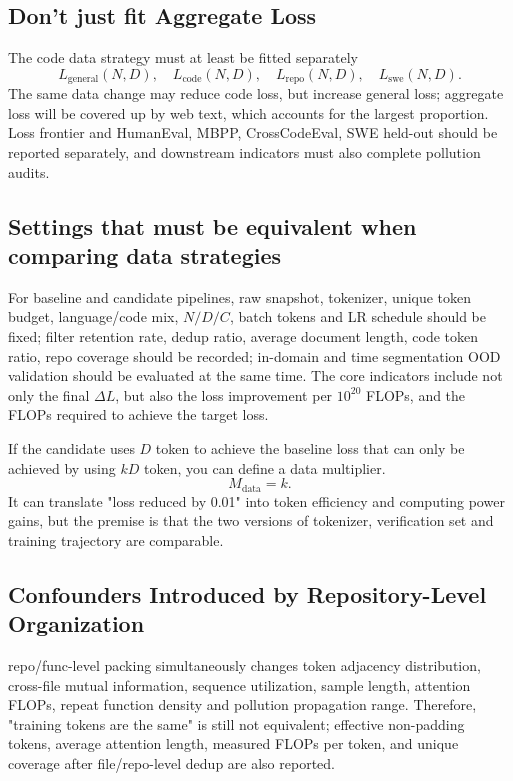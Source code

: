 \documentclass[UTF8,10pt,a4paper,fontset=none]{ctexart}
\begin{document}
\subsection{Don't just fit Aggregate Loss}

The code data strategy must at least be fitted separately
\begin{equation}
  L_{\mathrm{general}}(N,D),\quad L_{\mathrm{code}}(N,D),\quad
  L_{\mathrm{repo}}(N,D),\quad L_{\mathrm{swe}}(N,D).
  \label{en:eq:domain-losses}
\end{equation}
The same data change may reduce code loss, but increase general loss; aggregate loss will be covered up by web text, which accounts for the largest proportion. Loss frontier and HumanEval, MBPP, CrossCodeEval, SWE held-out should be reported separately, and downstream indicators must also complete pollution audits.

\subsection{Settings that must be equivalent when comparing data strategies}

For baseline and candidate pipelines, raw snapshot, tokenizer, unique token budget, language/code mix, $N/D/C$, batch tokens and LR schedule should be fixed; filter retention rate, dedup ratio, average document length, code token ratio, repo coverage should be recorded; in-domain and time segmentation OOD validation should be evaluated at the same time. The core indicators include not only the final $\Delta L$, but also the loss improvement per $10^{20}$ FLOPs, and the FLOPs required to achieve the target loss.

If the candidate uses $D$ token to achieve the baseline loss that can only be achieved by using $kD$ token, you can define a data multiplier.
\begin{equation}
  M_{\mathrm{data}}=k.
  \label{en:eq:data-multiplier}
\end{equation}
It can translate "loss reduced by 0.01" into token efficiency and computing power gains, but the premise is that the two versions of tokenizer, verification set and training trajectory are comparable.

\subsection{Confounders Introduced by Repository-Level Organization}

repo/func-level packing simultaneously changes token adjacency distribution, cross-file mutual information, sequence utilization, sample length, attention FLOPs, repeat function density and pollution propagation range. Therefore, "training tokens are the same" is still not equivalent; effective non-padding tokens, average attention length, measured FLOPs per token, and unique coverage after file/repo-level dedup are also reported.
\end{document}
